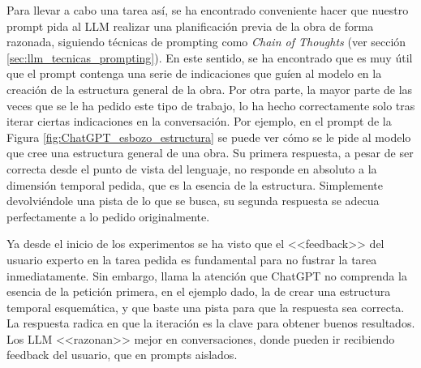 Para llevar a cabo una tarea así, se ha encontrado conveniente hacer que nuestro prompt pida al LLM realizar una planificación previa de la obra de forma razonada, siguiendo técnicas de prompting como \textit{Chain of Thoughts} (ver sección \ref{sec:llm_tecnicas_prompting}). En este sentido, se ha encontrado que es muy útil que el prompt contenga una serie de indicaciones que guíen al modelo en la creación de la estructura general de la obra. Por otra parte, la mayor parte de las veces que se le ha pedido este tipo de trabajo, lo ha hecho correctamente solo tras iterar ciertas indicaciones en la conversación.  Por ejemplo, en el prompt de la Figura \ref{fig:ChatGPT_esbozo_estructura} se puede ver cómo se le pide al modelo que cree una estructura general de una obra. Su primera respuesta, a pesar de ser correcta desde el punto de vista del lenguaje, no responde en absoluto a la dimensión temporal pedida, que es la esencia de la estructura. Simplemente devolviéndole una pista de lo que se busca, su segunda respuesta se adecua perfectamente a lo pedido originalmente. 

Ya desde el inicio de los experimentos se ha visto que el <<feedback>> del usuario experto en la tarea pedida es fundamental para no fustrar la tarea inmediatamente. Sin embargo, llama la atención que ChatGPT no comprenda la esencia de la petición primera, en el ejemplo dado, la de crear una estructura temporal esquemática, y que baste una pista para que la respuesta sea correcta. La respuesta radica en que la iteración es la clave para obtener buenos resultados. Los LLM <<razonan>> mejor en conversaciones, donde pueden ir recibiendo feedback del usuario, que en prompts aislados.


